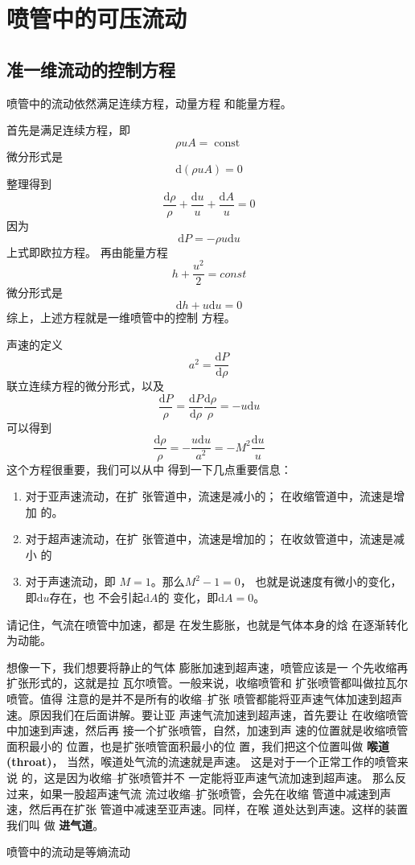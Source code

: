\chapter{喷管中的可压流动}
\section{准一维流动的控制方程}
喷管中的流动依然满足连续方程，动量方程
和能量方程。

首先是满足连续方程，即
$$
\rho u A=\operatorname{const}
$$
微分形式是
$$
\mathrm{d}\left(\rho u A\right)=0
$$
整理得到
$$
\frac{\mathrm{d}\rho}{\rho}
+\frac{\mathrm{d}u}{u}
+\frac{\mathrm{d}A}{u}=0
$$
因为
\[
  \mathrm{d}P=-\rho u \mathrm{d}u 
\]
上式即欧拉方程。
再由能量方程
\[
  h+\frac{u^2}{2}=const
\]
微分形式是
\[
  \mathrm{d}h+u \mathrm{d}u =0 
\]
综上，上述方程就是一维喷管中的控制
方程。

声速的定义
\[
  a^2=\frac{\mathrm{d}P }{\mathrm{d}\rho}
\]
联立连续方程的微分形式，以及
\[
  \frac{\mathrm{d}P }{\rho}= 
  \frac{\mathrm{d}P }{\mathrm{d}\rho}
  \frac{\mathrm{d}\rho}{\rho}= 
  - u \mathrm{d}u 
\]
可以得到
\[
  \frac{\mathrm{d}\rho}{\rho}
  = -\frac{u \mathrm{d}u }{a^2}
  = -M^2 \frac{\mathrm{d}u }{u}
\]
这个方程很重要，我们可以从中
得到一下几点重要信息：
\begin{enumerate}
  \item 对于亚声速流动，在扩
    张管道中，流速是减小的；
    在收缩管道中，流速是增加
    的。
  \item 对于超声速流动，在扩
    张管道中，流速是增加的；
    在收敛管道中，流速是减小
    的
  \item 对于声速流动，即
  $M=1$。那么$M^{2}-1=0$，
  也就是说速度有微小的变化，
  即$\mathrm{d}u$存在，也
  不会引起$\mathrm{d}A$的
  变化，即$\mathrm{d}A=0$。
\end{enumerate}
请记住，气流在喷管中加速，都是
在发生膨胀，也就是气体本身的焓
在逐渐转化为动能。

想像一下，我们想要将静止的气体
膨胀加速到超声速，喷管应该是一
个先收缩再扩张形式的，这就是拉
瓦尔喷管。一般来说，收缩喷管和
扩张喷管都叫做拉瓦尔喷管。值得
注意的是并不是所有的收缩--扩张
喷管都能将亚声速气体加速到超声
速。原因我们在后面讲解。要让亚
声速气流加速到超声速，首先要让
在收缩喷管中加速到声速，然后再
接一个扩张喷管，自然，加速到声
速的位置就是收缩喷管面积最小的
位置，也是扩张喷管面积最小的位
置，我们把这个位置叫做
{\bfseries 喉道(throat)}，
当然，喉道处气流的流速就是声速。
这是对于一个正常工作的喷管来说
的，这是因为收缩--扩张喷管并不
一定能将亚声速气流加速到超声速。
那么反过来，如果一股超声速气流
流过收缩--扩张喷管，会先在收缩
管道中减速到声速，然后再在扩张
管道中减速至亚声速。同样，在喉
道处达到声速。这样的装置我们叫
做
{\bfseries 进气道}。
\begin{note}
  喷管中的流动是等熵流动
\end{note}

